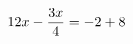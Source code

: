 \documentclass[preview]{standalone}
\begin{document}
\begin{align*}
\special{dvisvgm:raw <g id='unique000'>}12 x - \frac{3 x}{4} = -2 + 8\special{dvisvgm:raw </g>}
\end{align*}
\end{document}
